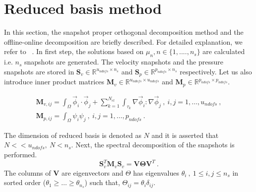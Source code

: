 \documentclass[graybox]{svmult}
\begin{document}
\section{Reduced basis method}\label{rb_section}

In this section, the snapshot proper orthogonal decomposition method and the offline-online decomposition are briefly described. For detailed explanation, we refer to ~\cite{CRBM}.
In first step, the solutions based on $\mu_n, n \in \lbrace 1,....,n_s \rbrace$ are calculated i.e. $n_s$ snapshots are generated. The velocity snapshots and the pressure snapshots are stored in $\bm{S}_v \in \mathbb{R}^{u_{ndofs} \times n_s}$ and $\bm{S}_p \in \mathbb{R}^{p_{ndofs} \times n_s}$ respectively. Let us also introduce inner product matrices $\bm{M}_v \in \mathbb{R}^{u_{ndofs} \times u_{ndofs}}$ and $\bm{M}_p \in \mathbb{R}^{p_{ndofs} \times p_{ndofs}}$.

\begin{gather*}
\bm{M}_{v,ij} = \int_{\Omega} \overrightarrow{\phi}_i \cdot \overrightarrow{\phi}_j + \sum_{k=1}^{N_{el}} \int_{\tau_k} \nabla \overrightarrow{\phi}_i : \nabla \overrightarrow{\phi}_j \ , \ i,j = 1, \ldots, u_{ndofs} \ , \\
\bm{M}_{p,ij} = \int_{\Omega} \psi_i \psi_j \ , \ i,j = 1, \ldots, p_{ndofs} \ .
\end{gather*}

The dimension of reduced basis is denoted as $N$ and it is asserted that $N << u_{ndofs}, \ N < n_s$. Next, the spectral decomposition of the snapshots is performed.
\begin{equation}\label{snapshot_eigen_value}
\bm{S}_v^T \bm{M}_v \bm{S}_v = \bm{V} \bm{\Theta} \bm{V}^T \ .
\end{equation}
The columns of $\bm{V}$ are eigenvectors and $\Theta$ has eigenvalues $\theta_i \ , \ 1 \leq i,j \leq n_s$ in sorted order ($\theta_1 \geq \ldots \geq \theta_{n_s}$) such that, $\Theta_{ij} = \theta_i \delta_{ij}$.

\end{document}
